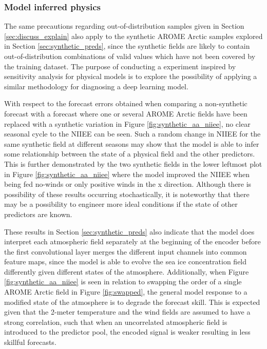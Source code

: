 \documentclass[../main/thesis]{subfiles}
\begin{document}
\subsubsection{Model inferred physics}
\label{sec:discuss_model_inferred_phys}
The same precautions regarding out-of-distribution samples given in Section \ref{sec:discuss_explain} also apply to the synthetic AROME Arctic samples explored in Section \ref{sec:synthetic_preds}, since the synthetic fields are likely to contain out-of-distribution combinations of valid values which have not been covered by the training dataset. The purpose of conducting a experiment inspired by sensitivity analysis for physical models is to explore the possibility of applying a similar methodology for diagnosing a deep learning model.

With respect to the forecast errors obtained when comparing a non-synthetic forecast with a forecast where one or several AROME Arctic fields have been replaced with a synthetic variation in Figure \ref{fig:synthetic_aa_niiee}, no clear seasonal cycle to the NIIEE can be seen. Such a random change in NIIEE for the same synthetic field at different seasons may show that the model is able to infer some relationship between the state of a physical field and the other predictors. This is further demonstrated by the two synthetic fields in the lower leftmost plot in Figure \ref{fig:synthetic_aa_niiee} where the model improved the NIIEE when being fed no-winds or only positive winds in the x direction. Although there is possibility of these results occurring stochastically, it is noteworthy that there may be a possibility to engineer more ideal conditions if the state of other predictors are known.

These results in Section \ref{sec:synthetic_preds} also indicate that the model does interpret each atmospheric field separately at the beginning of the encoder before the first convolutional layer merges the different input channels into common feature maps, since the model is able to evolve the sea ice concentration field differently given different states of the atmosphere. Additionally, when Figure \ref{fig:synthetic_aa_niiee} is seen in relation to swapping the order of a single AROME Arctic field in Figure \ref{fig:swapped}, the general model response to a modified state of the atmosphere is to degrade the forecast skill. This is expected given that the 2-meter temperature and the wind fields are assumed to have a strong correlation, such that when an uncorrelated atmospheric field is introduced to the predictor pool, the encoded signal is weaker resulting in less skillful forecasts.
\end{document}
